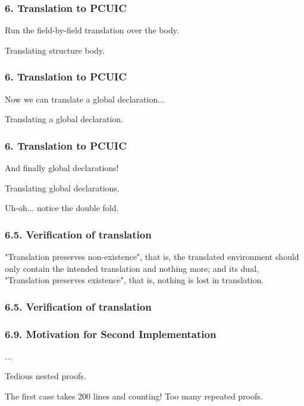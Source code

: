 \begin{frame}
  \frametitle{6. Translation to PCUIC}
  Run the field-by-field translation over the body.
  \begin{listing}[H]
      \caption{Translating structure body.}
    \end{listing}
\end{frame}

\begin{frame}
  \frametitle{6. Translation to PCUIC}
  Now we can translate a global declaration...
  \begin{listing}[H]
      \caption{Translating a global declaration.}
    \end{listing}
\end{frame}

\begin{frame}
  \frametitle{6. Translation to PCUIC}
  And finally global declarations!
  \begin{listing}[H]
      \caption{Translating global declarations.}
    \end{listing}
  \pause
  Uh-oh... notice the double fold.
\end{frame}

\begin{frame}
  \frametitle{6.5. Verification of translation}
  \begin{theorem}
    "Translation preserves non-existence", that is, the translated environment
    should only contain the intended translation and nothing more; and its dual,
    "Translation preserves existence", that is, nothing is lost in translation.
  \end{theorem}
\end{frame}

\begin{frame}
  \frametitle{6.5. Verification of translation}

  

\end{frame}

\begin{frame}
  \frametitle{6.9. Motivation for Second Implementation}
  \begin{listing}[H]
    ...
      \caption{Tedious nested proofs.}
    \end{listing}
    The first case takes 200 lines and counting! \pause
    Too many repeated proofs.
\end{frame}



